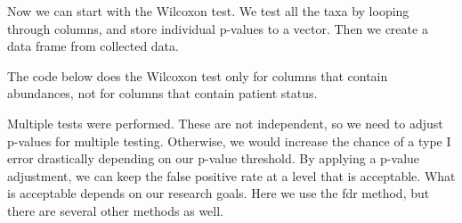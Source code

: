 \documentclass[
  oneside]{book}
\newenvironment{Shaded}{\begin{snugshade}}{\end{snugshade}}
\newcommand{\AttributeTok}[1]{\textcolor[rgb]{0.77,0.63,0.00}{#1}}
\newcommand{\CommentTok}[1]{\textcolor[rgb]{0.56,0.35,0.01}{\textit{#1}}}
\newcommand{\ControlFlowTok}[1]{\textcolor[rgb]{0.13,0.29,0.53}{\textbf{#1}}}
\newcommand{\FunctionTok}[1]{\textcolor[rgb]{0.00,0.00,0.00}{#1}}
\newcommand{\NormalTok}[1]{#1}
\newcommand{\OtherTok}[1]{\textcolor[rgb]{0.56,0.35,0.01}{#1}}
\newcommand{\SpecialCharTok}[1]{\textcolor[rgb]{0.00,0.00,0.00}{#1}}
\newcommand{\StringTok}[1]{\textcolor[rgb]{0.31,0.60,0.02}{#1}}
\begin{document}
Now we can start with the Wilcoxon test. We test all the taxa by looping through columns,
and store individual p-values to a vector. Then we create a data frame from collected
data.

The code below does the Wilcoxon test only for columns that contain abundances,
not for columns that contain patient status.

\begin{Shaded}
\end{Shaded}

Multiple tests were performed. These are not independent, so we need
to adjust p-values for multiple testing. Otherwise, we would increase
the chance of a type I error drastically depending on our p-value
threshold. By applying a p-value adjustment, we can keep the false
positive rate at a level that is acceptable. What is acceptable
depends on our research goals. Here we use the fdr method, but there
are several other methods as well.
\end{document}
